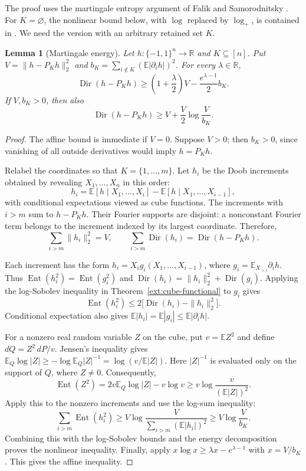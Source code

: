 \documentclass[11pt,letterpaper]{amsart}
\newcommand{\E}{\mathbb E}
\newcommand{\R}{\mathbb R}
\newcommand{\1}{\mathbf 1}
\DeclareMathOperator{\Ent}{Ent}
\newtheorem{lemma}[theorem]{Lemma}
\numberwithin{equation}{section}
\begin{document}
The proof uses the martingale entropy argument of Falik and
Samorodnitsky
\cite[Theorem~2.2 and Lemma~2.3]{FalikSamorodnitsky2007}.
For $K=\varnothing$, the nonlinear bound below, with $\log$
replaced by $\log_+$, is contained in
\cite[Theorem~1.9]{HanLi2026}.
We need the version with an arbitrary retained set $K$.

\begin{lemma}[Martingale energy]\label{as:strengthened-split}
Let $h:\{-1,1\}^n\to\R$ and $K\subseteq[n]$.
Put
$V=\|h-P_Kh\|_2^2$ and
$b_K=\sum_{i\notin K}(\E|\partial_i h|)^2$.
For every $\lambda\in\R$,
\[
 \operatorname{Dir}(h-P_Kh)
 \ge\left(1+\frac{\lambda}{2}\right)V
       -\frac{e^{\lambda-1}}2b_K.
\]
If $V,b_K>0$, then also
\[
 \operatorname{Dir}(h-P_Kh)
 \ge V+\frac V2\log\frac V{b_K}.
\]
\end{lemma}

\begin{proof}
The affine bound is immediate if $V=0$.
Suppose $V>0$; then $b_K>0$, since vanishing of all outside
derivatives would imply $h=P_Kh$.

Relabel the coordinates so that $K=\{1,\ldots,m\}$.
Let $h_i$ be the Doob increments obtained by revealing
$X_1,\ldots,X_n$ in this order:
\[
 h_i=\E[h\mid X_1,\ldots,X_i]
       -\E[h\mid X_1,\ldots,X_{i-1}],
\]
with conditional expectations viewed as cube functions.
The increments with $i>m$ sum to $h-P_Kh$.
Their Fourier supports are disjoint: a nonconstant Fourier
term belongs to the increment indexed by its largest coordinate.
Therefore,
\[
 \sum_{i>m}\|h_i\|_2^2=V,
 \qquad
 \sum_{i>m}\operatorname{Dir}(h_i)
 =\operatorname{Dir}(h-P_Kh).
\]

Each increment has the form
$h_i=X_i g_i(X_1,\ldots,X_{i-1})$, where
$g_i=\E_{X_{>i}}\partial_i h$.
Thus
$\Ent(h_i^2)=\Ent(g_i^2)$ and
$\operatorname{Dir}(h_i)=\|h_i\|_2^2+\operatorname{Dir}(g_i)$.
Applying the log-Sobolev inequality in
Theorem~\ref{ext:cube-functional} to $g_i$ gives
\[
 \Ent(h_i^2)
 \le2\bigl[\operatorname{Dir}(h_i)-\|h_i\|_2^2\bigr].
\]
Conditional expectation also gives
$\E|h_i|=\E|g_i|\le\E|\partial_i h|$.

For a nonzero real random variable $Z$ on the cube, put
$v=\E Z^2$ and define $dQ=Z^2\,dP/v$.
Jensen's inequality gives
$\E_Q\log|Z|\ge-\log\E_Q|Z|^{-1}
=\log(v/\E|Z|)$.
Here $|Z|^{-1}$ is evaluated only on the support of $Q$,
where $Z\ne0$.
Consequently,
\[
 \Ent(Z^2)
 =2v\E_Q\log|Z|-v\log v
 \ge v\log\frac{v}{(\E|Z|)^2}.
\]
Apply this to the nonzero increments and use the log-sum
inequality:
\[
 \sum_{i>m}\Ent(h_i^2)
 \ge V\log\frac{V}{\sum_{i>m}(\E|h_i|)^2}
 \ge V\log\frac{V}{b_K}.
\]
Combining this with the log-Sobolev bounds and the energy
decomposition proves the nonlinear inequality.
Finally, apply
$x\log x\ge\lambda x-e^{\lambda-1}$ with $x=V/b_K$.
This gives the affine inequality.
\end{proof}
\end{document}

